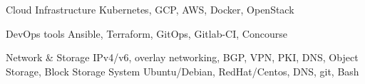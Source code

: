   \cvskill
    {Cloud Infrastructure}
    {Kubernetes, GCP, AWS, Docker, OpenStack}

  \cvskill
    {DevOps tools}
    {Ansible, Terraform, GitOps, Gitlab-CI, Concourse}

  \cvskill
    {Network \& Storage}
    {IPv4/v6, overlay networking, BGP, VPN, PKI, DNS, Object Storage, Block
    Storage}
  \cvskill
    {System}
    {Ubuntu/Debian, RedHat/Centos, DNS, git, Bash}

